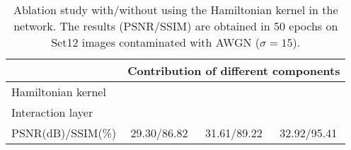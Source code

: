 \documentclass[10pt,journal,compsoc]{IEEEtran}
\newcommand{\cmark}{\ding{51}}%
\newcommand{\xmark}{\ding{55}}%
\begin{document}
\begin{table}[t!]
\setlength\tabcolsep{10pt}
\begin{scriptsize}
\begin{center}
\caption{Ablation study with/without using the Hamiltonian kernel in the network. The results (PSNR/SSIM) are obtained in 50 epochs on Set12 images contaminated with AWGN ($\sigma = 15$).}
\label{tab:tab_ablation_Hamiltonian}
\begin{tabular}{l ccc}
\hline
 & \multicolumn{3}{c}{Contribution of different components}\\ 
\hline

Hamiltonian kernel	& \xmark & \cmark & \cmark \\

Interaction layer	& \xmark & \xmark & \cmark \\
\hline

PSNR(dB)/SSIM(\%)	& 29.30/86.82 & 31.61/89.22 & 32.92/95.41 \\

\hline
\end{tabular}\end{center}
\end{scriptsize}
\end{table}
\end{document}
